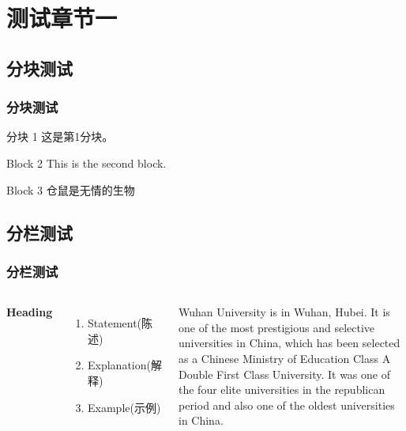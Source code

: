 \documentclass[presentation,aspectratio=1610]{beamer}
\begin{document}
\section{测试章节一} %

\subsection{分块测试} %

\begin{frame}
\frametitle{分块测试}
	\begin{block}{分块 1}
	这是第1分块。
	\end{block}

	\begin{block}{Block 2}
	This is the second block.
	\end{block}

	\begin{block}{Block 3}
	仓鼠是无情的生物
	\end{block}
\end{frame}


\subsection{分栏测试}

\begin{frame}
\frametitle{分栏测试}
\begin{columns}[c] %

\textbf{Heading}
\begin{enumerate}
\item Statement(陈述)
\item Explanation(解释)
\item Example(示例)
\end{enumerate}

Wuhan University is in Wuhan, Hubei.
It is one of the most prestigious and selective universities in China, which has been selected as a Chinese Ministry of Education Class A Double First Class University.
It was one of the four elite universities in the republican period and also one of the oldest universities in China.

\end{columns}
\end{frame}
\end{document}

